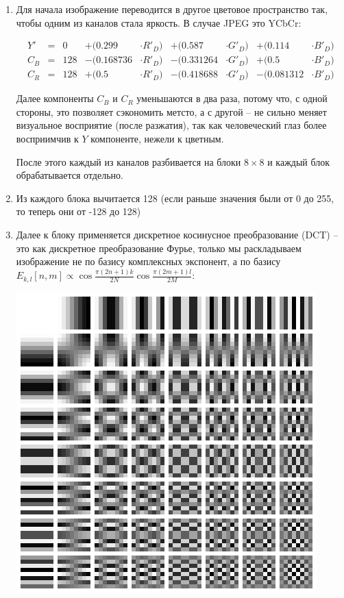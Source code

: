 \documentclass[]{book}
\theoremstyle{definition}
\begin{document}
\begin{enumerate}
    \item Для начала изображение переводится в другое цветовое пространство так, чтобы одним из каналов стала яркость. В случае JPEG это YCbCr:
    
    \begin{align*}
        Y'&=&0&+(0.299&\cdot R'_{D})&+(0.587&\cdot G'_{D})&+(0.114&\cdot B'_{D})\\
        C_{B}&=&128&-(0.168736&\cdot R'_{D})&-(0.331264&\cdot G'_{D})&+(0.5&\cdot B'_{D})\\
        C_{R}&=&128&+(0.5&\cdot R'_{D})&-(0.418688&\cdot G'_{D})&-(0.081312&\cdot B'_{D})
    \end{align*}
    
    Далее компоненты $C_B$ и $C_R$ уменьшаются в два раза, потому что, с одной стороны, это позволяет сэкономить метсто, а с другой -- не сильно меняет визуальное восприятие (после разжатия), так как человеческий глаз более восприимчив к $Y$ компоненте, нежели к цветным.
    
    После этого каждый из каналов разбивается на блоки $8\times8$ и каждый блок обрабатывается отдельно.
    
    \item Из каждого блока вычитается 128 (если раньше значения были от 0 до 255, то теперь они от -128 до 128)
    
    \item Далее к блоку применяется дискретное косинусное преобразование (DCT) -- это как дискретное преобразование Фурье, только мы раскладываем изображение не по базису комплексных экспонент, а по базису $E_{k, l}[n, m] \propto  \cos \frac{\pi (2n + 1)k}{2N}\cos\frac{\pi (2m + 1)l}{2M}$:
    
    \begin{center}
        \includegraphics[scale=0.4]{images/DCT-8x8.png}
    \end{center}
    

\end{enumerate}
\end{document}
